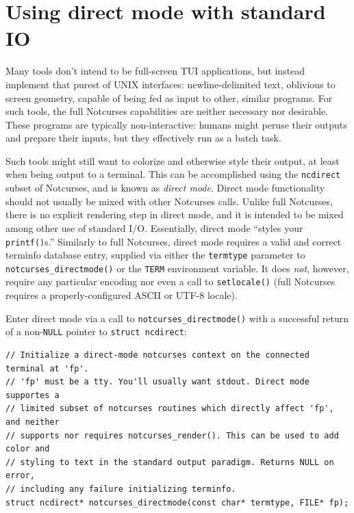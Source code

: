 \documentclass[letterpaper,10pt]{article}
\begin{document}
\newpage

\section{Using direct mode with standard I\/O}

Many tools don't intend to be full-screen TUI applications, but instead
implement that purest of UNIX interfaces: newline-delimited text, oblivious
to screen geometry, capable of being fed as input to other, similar programs.
For such tools, the full Notcurses capabilities are neither necessary nor
desirable. These programs are typically non-interactive: humans might peruse
their outputs and prepare their inputs, but they effectively run as a batch
task.

 Such tools might still want to colorize and otherwise style their output, at
least when being output to a terminal. This can be accomplished using the
\texttt{ncdirect} subset of Notcurses, and is known as \textit{direct mode}. Direct
mode functionality should not usually be mixed with other Notcurses calls.
Unlike full Notcurses, there is no explicit rendering step in direct mode, and
it is intended to be mixed among other use of standard I/O. Essentially, direct
mode ``styles your \texttt{printf()}s.'' Similarly to full Notcurses, direct mode
requires a valid and correct terminfo database entry, supplied via either the
\texttt{termtype} parameter to \texttt{notcurses\_directmode()} or the \texttt{TERM} environment
variable. It does \textit{not}, however, require any particular encoding nor
even a call to \texttt{setlocale()} (full Notcurses requires a properly-configured
ASCII or UTF-8 locale).

Enter direct mode via a call to \texttt{notcurses\_directmode()} with a successful
return of a non-\texttt{NULL} pointer to \texttt{struct ncdirect}:

\begin{listing}[!htbp]
\begin{verbatim}
// Initialize a direct-mode notcurses context on the connected terminal at 'fp'.
// 'fp' must be a tty. You'll usually want stdout. Direct mode supportes a
// limited subset of notcurses routines which directly affect 'fp', and neither
// supports nor requires notcurses_render(). This can be used to add color and
// styling to text in the standard output paradigm. Returns NULL on error,
// including any failure initializing terminfo.
struct ncdirect* notcurses_directmode(const char* termtype, FILE* fp);
\end{verbatim}
\end{listing}
\end{document}
